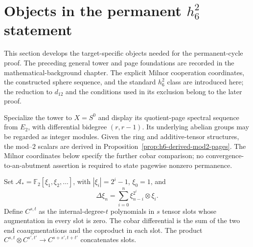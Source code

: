 \section{Objects in the permanent $h_6^2$ statement}
\label{chap:h6-statement}

This section develops the target-specific objects needed for the permanent-cycle
proof. The preceding general tower and page foundations are recorded in the
mathematical-background chapter. The explicit Milnor cooperation coordinates, the
constructed sphere sequence, and the standard $h_6^2$ class are introduced
here; the reduction to $d_{12}$ and the conditions used in its exclusion
belong to the later proof.

\begin{definition}
  \label{def:h6-constructed-sphere-sequence}
  \leanok
  Specialize the tower to $X=S^0$ and display its quotient-page spectral
  sequence from $E_2$, with differential bidegree $(r,r-1)$.
  Its underlying abelian groups may be regarded as integer modules.
  Given the ring and additive-tensor structures, the mod--$2$ scalars are
  derived in Proposition~\ref{prop:h6-derived-mod2-pages}. The Milnor
  coordinates below specify the further cobar comparison; no
  convergence-to-an-abutment assertion is required to state pagewise
  nonzero permanence.
\end{definition}

\begin{definition}
  \label{def:h6-milnor-cobar}
  \leanok
  Set $\mathcal A_*=\mathbb F_2[\xi_1,\xi_2,\ldots]$, with
  $|\xi_i|=2^i-1$, $\xi_0=1$, and
  \[
    \Delta\xi_n=\sum_{i=0}^n\xi_{n-i}^{2^i}\otimes\xi_i.
  \]
  Define $C^{s,t}$ as the internal-degree-$t$ polynomials in $s$ tensor
  slots whose augmentation in every slot is zero.  The cobar differential
  is the sum of the two end coaugmentations and the coproduct in each slot.
  The product $C^{s,t}\otimes C^{s',t'}\to C^{s+s',t+t'}$ concatenates slots.
\end{definition}

